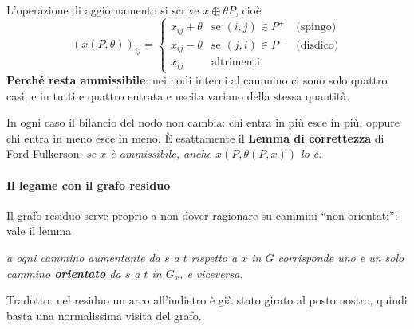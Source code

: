 \documentclass[12pt]{extarticle} %
\begin{document}
\noindent L'operazione di aggiornamento si scrive $x \oplus \theta P$, cioè
\[
(x(P,\theta))_{ij} = \begin{cases}
x_{ij} + \theta & \text{se } (i,j) \in P^+ \quad \text{(spingo)}\\
x_{ij} - \theta & \text{se } (j,i) \in P^- \quad \text{(disdico)}\\
x_{ij} & \text{altrimenti}
\end{cases}
\]
\textbf{Perché resta ammissibile}: nei nodi interni al cammino ci sono solo quattro casi, e in tutti e quattro entrata e uscita variano della stessa quantità.
\begin{center}
\end{center}
In ogni caso il bilancio del nodo non cambia: chi entra in più esce in più, oppure chi entra in meno esce in meno. È esattamente il \textbf{Lemma di correttezza} di Ford-Fulkerson: \emph{se $x$ è ammissibile, anche $x(P,\theta(P,x))$ lo è}.

\paragraph{Il legame con il grafo residuo}
Il grafo residuo serve proprio a non dover ragionare su cammini ``non orientati'': vale il lemma
\begin{center}
\emph{a ogni cammino aumentante da $s$ a $t$ rispetto a $x$ in $G$ corrisponde uno e un solo cammino \textbf{orientato} da $s$ a $t$ in $G_x$, e viceversa.}
\end{center}
Tradotto: nel residuo un arco all'indietro è già stato girato al posto nostro, quindi basta una normalissima visita del grafo.
\end{document}
